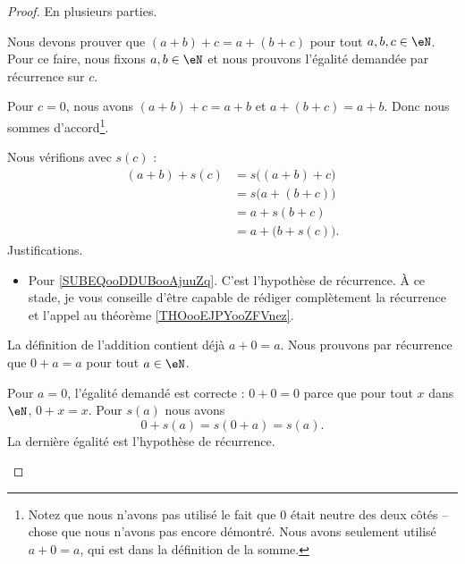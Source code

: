 \begin{proof}
	En plusieurs parties.
	\begin{subproof}
		\spitem[Associative]
		Nous devons prouver que \( (a+b)+c=a+(b+c)\) pour tout \( a,b,c\in \eN\). Pour ce faire, nous fixons \( a,b\in\eN\) et nous prouvons l'égalité demandée par récurrence sur \( c\).

		Pour \( c=0\), nous avons \( (a+b)+c=a+b\) et \( a+(b+c)=a+b\). Donc nous sommes d'accord\footnote{Notez que nous n'avons pas utilisé le fait que \( 0\) était neutre des deux côtés -- chose que nous n'avons pas encore démontré. Nous avons seulement utilisé \( a+0=a\), qui est dans la définition de la somme.}.

		Nous vérifions avec \( s(c)\) :
		\begin{subequations}
			\begin{align}
				(a+b)+s(c) & =s\big( (a+b)+c \big)                              \\
				           & =s\big( a+(b+c) \big)  \label{SUBEQooDDUBooAjuuZq} \\
				           & =a+s(b+c)                                          \\
				           & =a+\big( b+s(c) \big).
			\end{align}
		\end{subequations}
		Justifications.
		\begin{itemize}
			\item Pour \eqref{SUBEQooDDUBooAjuuZq}. C'est l'hypothèse de récurrence. À ce stade, je vous conseille d'être capable de rédiger complètement la récurrence et l'appel au théorème \ref{THOooEJPYooZFVnez}.
		\end{itemize}
		\spitem[Neutre]
		La définition de l'addition contient déjà \( a+0=a\). Nous prouvons par récurrence que \( 0+a=a\) pour tout \( a\in \eN\).

		Pour \( a=0\), l'égalité demandé est correcte : \( 0+0=0\) parce que pour tout \( x\) dans \( \eN\), \( 0+x=x\). Pour \( s(a)\) nous avons
		\begin{equation}
			0+s(a)=s(0+a)=s(a).
		\end{equation}
		La dernière égalité est l'hypothèse de récurrence.


\end{subproof}
\end{proof}

